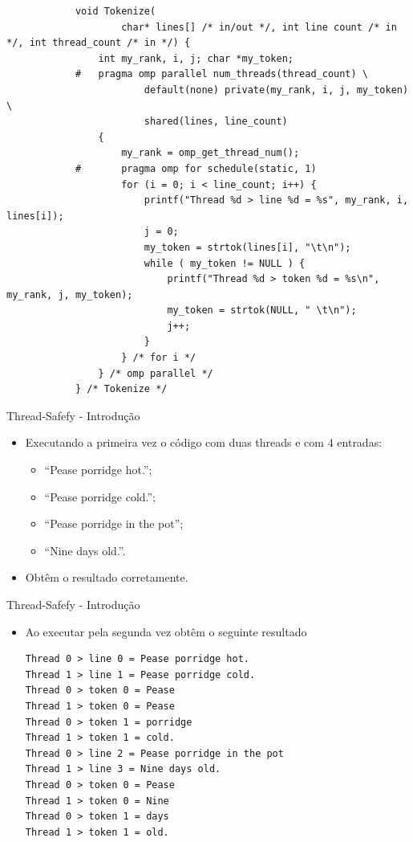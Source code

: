 	\begin{frame}[fragile]
		\begin{verbatim}
			void Tokenize(
					char* lines[] /* in/out */, int line count /* in */, int thread_count /* in */) {
				int my_rank, i, j; char *my_token;
			#	pragma omp parallel num_threads(thread_count) \ 
						default(none) private(my_rank, i, j, my_token) \ 
						shared(lines, line_count)
				{
					my_rank = omp_get_thread_num(); 
			#		pragma omp for schedule(static, 1) 
					for (i = 0; i < line_count; i++) {
						printf("Thread %d > line %d = %s", my_rank, i, lines[i]);
						j = 0;
						my_token = strtok(lines[i], "\t\n");
						while ( my_token != NULL ) {
							printf("Thread %d > token %d = %s\n", my_rank, j, my_token);
							my_token = strtok(NULL, " \t\n");
							j++;
						}
					} /* for i */
				} /* omp parallel */
			} /* Tokenize */
		\end{verbatim}
\end{frame}

	\begin{frame}[fragile]{Thread-Safefy - Introdução}
		\begin{itemize}
			\item Executando a primeira vez o código com duas threads e com 4 entradas: 
			\begin{itemize}
				\item ``Pease porridge hot.'';
				\item ``Pease porridge cold.'';
				\item ``Pease porridge in the pot'';
				\item ``Nine days old.''.
			\end{itemize}
					\bigskip
			\item Obtêm o resultado corretamente.
		\end{itemize}
\end{frame}


	\begin{frame}[fragile]{Thread-Safefy - Introdução}
		\begin{itemize}
			\item Ao executar pela segunda vez obtêm o seguinte resultado
			\begin{verbatim}
Thread 0 > line 0 = Pease porridge hot.
Thread 1 > line 1 = Pease porridge cold.
Thread 0 > token 0 = Pease
Thread 1 > token 0 = Pease
Thread 0 > token 1 = porridge
Thread 1 > token 1 = cold.
Thread 0 > line 2 = Pease porridge in the pot 
Thread 1 > line 3 = Nine days old.
Thread 0 > token 0 = Pease 
Thread 1 > token 0 = Nine 
Thread 0 > token 1 = days 
Thread 1 > token 1 = old.
			\end{verbatim}
		\end{itemize}
\end{frame}

